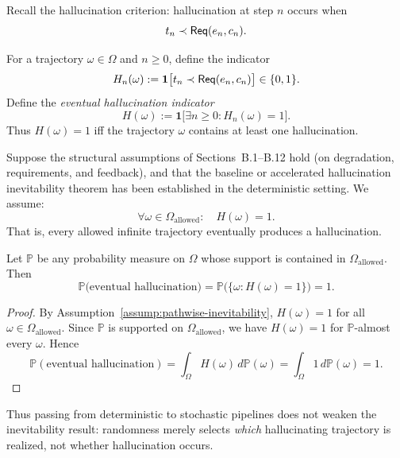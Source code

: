 Recall the hallucination criterion: hallucination at step \(n\) occurs
when
\[
t_n \prec \mathsf{Req}(e_n,c_n).
\]

\begin{definition}
For a trajectory \(\omega\in\Omega\) and \(n\ge 0\), define the
indicator
\[
H_n(\omega)
 :=
 \mathbf{1}\bigl[t_n \prec \mathsf{Req}(e_n,c_n)\bigr] \in \{0,1\}.
\]
Define the \emph{eventual hallucination indicator}
\[
H(\omega)
 :=
 \mathbf{1}\bigl[ \exists n\ge 0 : H_n(\omega)=1 \bigr].
\]
Thus \(H(\omega)=1\) iff the trajectory \(\omega\) contains at least one
hallucination.
\end{definition}

\begin{assumption}
\label{assump:pathwise-inevitability}
Suppose the structural assumptions of Sections~B.1--B.12 hold (on
degradation, requirements, and feedback), and that the baseline or
accelerated hallucination inevitability theorem has been established in
the deterministic setting. We assume:
\[
\forall \omega \in \Omega_{\mathrm{allowed}}:\quad H(\omega)=1.
\]
That is, every allowed infinite trajectory eventually produces a
hallucination.
\end{assumption}

\begin{theorem}
\label{thm:stochastic-inevitability}
Let \(\mathbb{P}\) be any probability measure on \(\Omega\) whose
support is contained in \(\Omega_{\mathrm{allowed}}\). Then
\[
\mathbb{P}\bigl( \text{eventual hallucination} \bigr)
 =
\mathbb{P}\bigl( \{\omega : H(\omega)=1\} \bigr)
 =
1.
\]
\end{theorem}

\begin{proof}
By Assumption~\ref{assump:pathwise-inevitability}, \(H(\omega)=1\) for
all \(\omega\in\Omega_{\mathrm{allowed}}\). Since \(\mathbb{P}\) is
supported on \(\Omega_{\mathrm{allowed}}\), we have \(H(\omega)=1\) for
\(\mathbb{P}\)-almost every \(\omega\). Hence
\[
\mathbb{P}(\text{eventual hallucination})
 =
\int_{\Omega} H(\omega)\, d\mathbb{P}(\omega)
 =
\int_{\Omega} 1\, d\mathbb{P}(\omega)
 =
1.
\]
\end{proof}

Thus passing from deterministic to stochastic pipelines does not weaken
the inevitability result: randomness merely selects \emph{which}
hallucinating trajectory is realized, not whether hallucination occurs.



